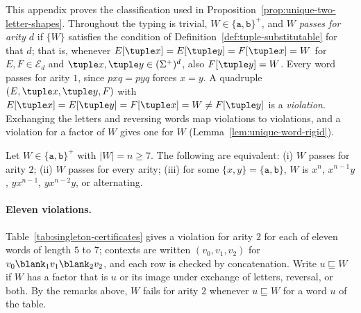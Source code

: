 This appendix proves the classification used in
Proposition~\ref{prop:unique-two-letter-shapes}.  Throughout the typing is
trivial, $W\in\{\mathtt a,\mathtt b\}^+$, and \emph{$W$ passes for arity $d$} if
$\{W\}$ satisfies the condition of Definition~\ref{def:tuple-substitutable} for
that $d$; that is, whenever $E[\tuple x]=E[\tuple y]=F[\tuple x]=W$ for
$E,F\in\mathcal E_d$ and $\tuple x,\tuple y\in(\Sigma^+)^d$, also $F[\tuple y]=W$.
Every word passes for arity $1$, since $pxq=pyq$ forces $x=y$.  A quadruple
$(E,\tuple x,\tuple y,F)$ with $E[\tuple x]=E[\tuple y]=F[\tuple x]=W\ne F[\tuple y]$
is a \emph{violation}.  Exchanging the letters and reversing words map violations
to violations, and a violation for a factor of $W$ gives one for $W$
(Lemma~\ref{lem:unique-word-rigid}).

\begin{theorem}\label{thm:app-singleton}
Let $W\in\{\mathtt a,\mathtt b\}^+$ with $|W|=n\ge7$.  The following are equivalent:
\textup{(i)} $W$ passes for arity $2$; \textup{(ii)} $W$ passes for every arity;
\textup{(iii)} for some $\{x,y\}=\{\mathtt a,\mathtt b\}$, $W$ is $x^n$, $x^{n-1}y$,
$yx^{n-1}$, $yx^{n-2}y$, or alternating.
\end{theorem}

\paragraph{Eleven violations.}
Table~\ref{tab:singleton-certificates} gives a violation for arity $2$ for each of
eleven words of length $5$ to $7$; contexts are written $(v_0,v_1,v_2)$ for
$v_0\blank_1v_1\blank_2v_2$, and each row is checked by concatenation.  Write
$u\sqsubseteq W$ if $W$ has a factor that is $u$ or its image under exchange of
letters, reversal, or both.  By the remarks above, $W$ fails for arity $2$
whenever $u\sqsubseteq W$ for a word $u$ of the table.


